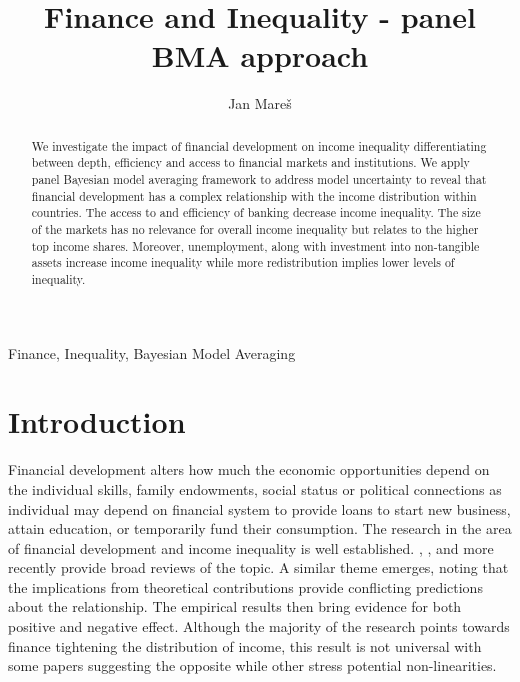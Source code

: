 \documentclass[preprint, nonatbib, 10pt]{elsarticle}
\begin{document}
\begin{frontmatter}

\title{Finance and Inequality - panel BMA approach}

\author[1]{Jan Mare\v{s}}
\address[1]{IES, Faculty of Social Sciences, Charles University, Opletalova 26, Prague}



\begin{abstract}
  We investigate the impact of financial development on income inequality differentiating between depth, efficiency and access to financial markets and institutions. We apply panel Bayesian model averaging framework to address model uncertainty to reveal that financial development has a complex relationship with the income distribution within countries. The access to and efficiency of banking decrease income inequality. The size of the markets has no relevance for overall income inequality but relates to the higher top income shares. Moreover, unemployment, along with investment into non-tangible assets increase income inequality while more redistribution implies lower levels of inequality.
\end{abstract}

\begin{keyword}
Finance, Inequality, Bayesian Model Averaging
\end{keyword}

\end{frontmatter}


\section{Introduction}
\label{sec:intro}
Financial development alters how much the economic opportunities depend on the individual skills, family endowments, social status or political connections as individual may depend on financial system to provide loans to start new business, attain education, or temporarily fund their consumption. The research in the area of financial development and income inequality is well established. \textcite{demirgucc2009finance}, \textcite{claessens2007finance}, and more recently \textcite{de2017finance} provide broad reviews of the topic. A similar theme emerges, noting that the implications from theoretical contributions provide conflicting predictions about the relationship. The empirical results then bring evidence for both positive and negative effect. Although the majority of the research points towards finance tightening the distribution of income, this result is not universal with some papers suggesting the opposite while other stress potential non-linearities.
\end{document}
